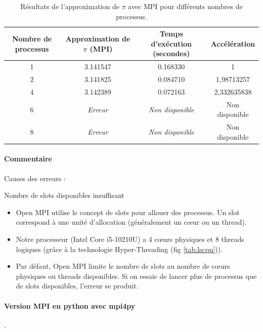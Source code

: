 \documentclass[a4paper,13pt]{book}
\begin{document}
    \begin{table}[h!]
        \centering
        \begin{tabular}{|c|c|c|c|}
        \hline
        \textbf{Nombre de processus} & \textbf{Approximation de $\pi$ (MPI)} & \textbf{Temps d'exécution (secondes)} & \textbf{Accélération} \\
        \hline
        1                           & 3.141547                              & 0.168330                  & 1 \\\hline
        2                           & 3.141825                              & 0.084710                 &    1,98713257          \\\hline
        4                           & 3.142389                              & 0.072163                   &     2,332635838       \\\hline
        6                           & \textit{Erreur}                       & \textit{Non disponible}      & Non disponible         \\\hline
        8                           & \textit{Erreur}                       & \textit{Non disponible}      & Non disponible         \\\hline
        \end{tabular}
        \caption{Résultats de l'approximation de $\pi$ avec MPI pour différents nombres de processus.}
        \label{tab:pi_mpi}
        \end{table}
    
    \paragraph{Commentaire }
    Causes des erreurs : 
    \item Nombre de slots disponibles insuffisant
    \begin{itemize}
    \item Open MPI utilise le concept de slots pour allouer des processus. Un slot correspond à une unité d'allocation (généralement un cœur ou un thread).
    \item Notre processeur (Intel Core i5-10210U) a 4 cœurs physiques et 8 threads logiques (grâce à la technologie Hyper-Threading (fig \ref{tab:lscpu})).
    \item Par défaut, Open MPI limite le nombre de slots au nombre de cœurs physiques ou threads disponibles. Si on essaie de lancer plus de processus que de slots disponibles, l'erreur se produit.
    \end{itemize}
\paragraph{Version MPI en python avec mpi4py}.\\
\end{document}
